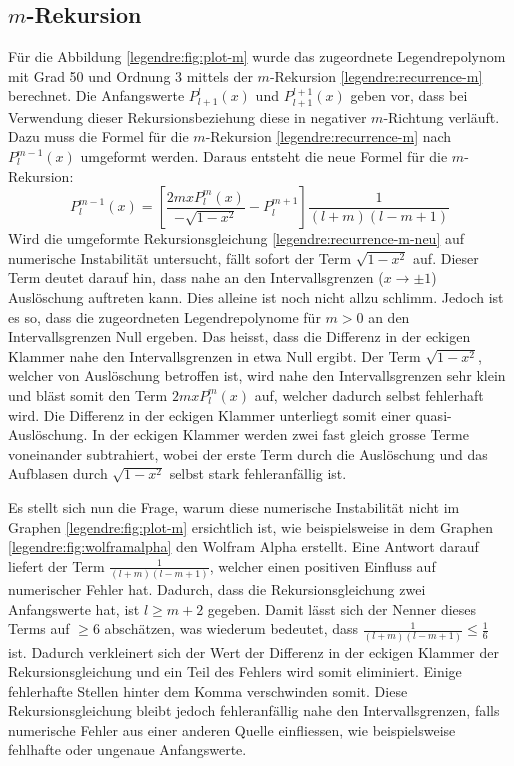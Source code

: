 \subsection{$m$-Rekursion
\label{legendre:subsection:mrichtung}}
Für die Abbildung \ref{legendre:fig:plot-m} wurde das zugeordnete Legendrepolynom mit Grad 50 und Ordnung 3 mittels der $m$-Rekursion \eqref{legendre:recurrence-m} berechnet.
Die Anfangswerte $P^{l}_{l+1}(x)$ und $P^{l+1}_{l+1}(x)$ geben vor, dass bei Verwendung dieser Rekursionsbeziehung diese in negativer $m$-Richtung verläuft.
Dazu muss die Formel für die $m$-Rekursion \eqref{legendre:recurrence-m} nach $P^{m-1}_{l}(x)$ umgeformt werden.
Daraus entsteht die neue Formel für die $m$-Rekursion:  
\begin{equation}
P^{m-1}_{l}(x)
= \left[ \frac{2mxP^{m}_{l}(x)}{- \sqrt{1-x^2}}-P^{m+1}_{l} \right]
\frac{1}{(l+m)(l-m+1)}
\label{legendre:recurrence-m-neu}
\end{equation}
Wird die umgeformte Rekursionsgleichung \eqref{legendre:recurrence-m-neu} auf numerische Instabilität untersucht, fällt sofort der Term $\sqrt{1-x^2}$ auf.
Dieser Term deutet darauf hin, dass nahe an den Intervallsgrenzen ($x \rightarrow \pm 1$) Auslöschung auftreten kann.
Dies alleine ist noch nicht allzu schlimm.
Jedoch ist es so, dass die zugeordneten Legendrepolynome für $m>0$ an den Intervallsgrenzen Null ergeben.
Das heisst, dass die Differenz in der eckigen Klammer nahe den Intervallsgrenzen in etwa Null ergibt.
Der Term $\sqrt{1-x^2}$, welcher von Auslöschung betroffen ist, wird nahe den Intervallsgrenzen sehr klein und bläst somit den Term $2mxP^{m}_{l}(x)$ auf, welcher dadurch selbst fehlerhaft wird.
Die Differenz in der eckigen Klammer unterliegt somit einer quasi-Auslöschung.
In der eckigen Klammer werden zwei fast gleich grosse Terme voneinander subtrahiert, wobei der erste Term durch die Auslöschung und das Aufblasen durch $\sqrt{1-x^2}$ selbst stark fehleranfällig ist.

Es stellt sich nun die Frage, warum diese numerische Instabilität nicht im Graphen \ref{legendre:fig:plot-m} ersichtlich ist, wie beispielsweise in dem Graphen \ref{legendre:fig:wolframalpha} den Wolfram Alpha erstellt.
Eine Antwort darauf liefert der Term $\frac{1}{(l+m)(l-m+1)}$, welcher einen positiven Einfluss auf numerischer Fehler hat.
Dadurch, dass die Rekursionsgleichung zwei Anfangswerte hat, ist $l\geq m+2$ gegeben.
Damit lässt sich der Nenner dieses Terms auf $\geq 6$ abschätzen, was wiederum bedeutet, dass $\frac{1}{(l+m)(l-m+1)} \leq \frac{1}{6}$ ist.
Dadurch verkleinert sich der Wert der Differenz in der eckigen Klammer der Rekursionsgleichung und ein Teil des Fehlers wird somit eliminiert.
Einige fehlerhafte Stellen hinter dem Komma verschwinden somit.
Diese Rekursionsgleichung bleibt jedoch fehleranfällig nahe den Intervallsgrenzen, falls numerische Fehler aus einer anderen Quelle einfliessen, wie beispielsweise fehlhafte oder ungenaue Anfangswerte.

